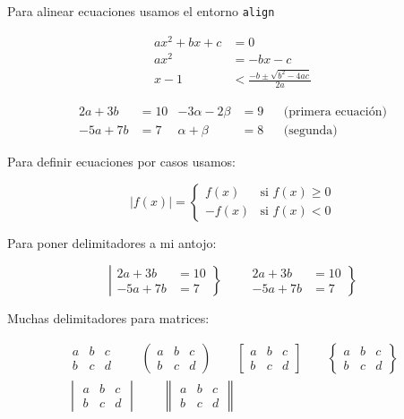 Para alinear ecuaciones usamos el entorno \texttt{align}

\begin{align}
  ax^2 + bx + c &= 0\\
  ax^2 &= -bx -c\\
  x -1 &< \frac{-b \pm\sqrt{b^2 - 4ac}}{2a}
\end{align}

\begin{align*}
  2a + 3b &= 10 & -3\alpha - 2\beta &= 9 & &\text{(primera ecuación)}\\
  -5a + 7b &= 7 & \alpha + \beta &= 8 & &\text{(segunda)}
\end{align*}

Para definir ecuaciones por casos usamos:

\begin{equation*}
  |f(x)| = \begin{cases}
    f(x) & \text{si $f(x) \geq 0$}\\
    -f(x) & \text{si $f(x) < 0$}
  \end{cases}
\end{equation*}

Para poner delimitadores a mi antojo:

\begin{equation*}
  \left|\begin{aligned}
    2a+3b &= 10\\
    -5a+7b &= 7
  \end{aligned}\right\} \qquad
  \left.\begin{aligned}
    2a+3b &= 10\\
    -5a+7b &= 7
  \end{aligned}\right\}
\end{equation*}

Muchas delimitadores para matrices:

\begin{gather*}
  \begin{matrix}
    a & b & c \\
    b & c & d
  \end{matrix}\qquad
  \begin{pmatrix}
    a & b & c \\
    b & c & d
  \end{pmatrix}\qquad
  \begin{bmatrix}
    a & b & c \\
    b & c & d
  \end{bmatrix}\qquad 
  \begin{Bmatrix}
    a & b & c \\
    b & c & d
  \end{Bmatrix}\\[10pt]
  \begin{vmatrix}
    a & b & c \\
    b & c & d
  \end{vmatrix}\qquad  
  \begin{Vmatrix}
    a & b & c \\
    b & c & d
  \end{Vmatrix}\qquad
\end{gather*}



